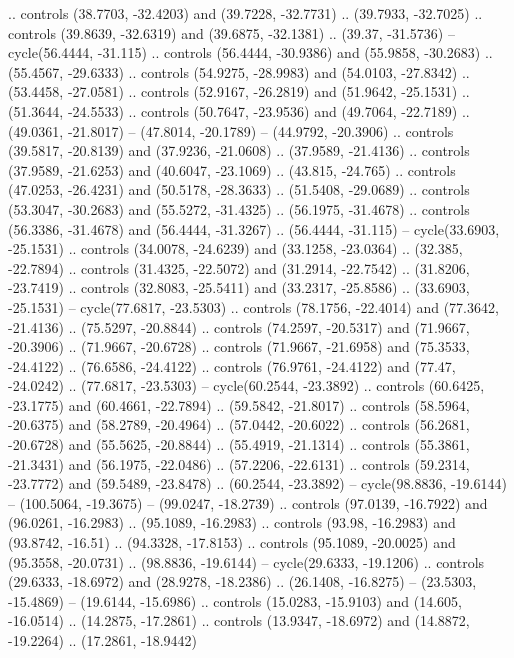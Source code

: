 {  .. controls (38.7703, -32.4203) and (39.7228, -32.7731) .. (39.7933, -32.7025)
  .. controls (39.8639, -32.6319) and (39.6875, -32.1381) .. (39.37, -31.5736)
  -- cycle(56.4444, -31.115)
  .. controls (56.4444, -30.9386) and (55.9858, -30.2683) .. (55.4567, -29.6333)
  .. controls (54.9275, -28.9983) and (54.0103, -27.8342) .. (53.4458, -27.0581)
  .. controls (52.9167, -26.2819) and (51.9642, -25.1531) .. (51.3644, -24.5533)
  .. controls (50.7647, -23.9536) and (49.7064, -22.7189) .. (49.0361, -21.8017)
  -- (47.8014, -20.1789)
  -- (44.9792, -20.3906)
  .. controls (39.5817, -20.8139) and (37.9236, -21.0608) .. (37.9589, -21.4136)
  .. controls (37.9589, -21.6253) and (40.6047, -23.1069) .. (43.815, -24.765)
  .. controls (47.0253, -26.4231) and (50.5178, -28.3633) .. (51.5408, -29.0689)
  .. controls (53.3047, -30.2683) and (55.5272, -31.4325) .. (56.1975, -31.4678)
  .. controls (56.3386, -31.4678) and (56.4444, -31.3267) .. (56.4444, -31.115)
  -- cycle(33.6903, -25.1531)
  .. controls (34.0078, -24.6239) and (33.1258, -23.0364) .. (32.385, -22.7894)
  .. controls (31.4325, -22.5072) and (31.2914, -22.7542) .. (31.8206, -23.7419)
  .. controls (32.8083, -25.5411) and (33.2317, -25.8586) .. (33.6903, -25.1531)
  -- cycle(77.6817, -23.5303)
  .. controls (78.1756, -22.4014) and (77.3642, -21.4136) .. (75.5297, -20.8844)
  .. controls (74.2597, -20.5317) and (71.9667, -20.3906) .. (71.9667, -20.6728)
  .. controls (71.9667, -21.6958) and (75.3533, -24.4122) .. (76.6586, -24.4122)
  .. controls (76.9761, -24.4122) and (77.47, -24.0242) .. (77.6817, -23.5303)
  -- cycle(60.2544, -23.3892)
  .. controls (60.6425, -23.1775) and (60.4661, -22.7894) .. (59.5842, -21.8017)
  .. controls (58.5964, -20.6375) and (58.2789, -20.4964) .. (57.0442, -20.6022)
  .. controls (56.2681, -20.6728) and (55.5625, -20.8844) .. (55.4919, -21.1314)
  .. controls (55.3861, -21.3431) and (56.1975, -22.0486) .. (57.2206, -22.6131)
  .. controls (59.2314, -23.7772) and (59.5489, -23.8478) .. (60.2544, -23.3892)
  -- cycle(98.8836, -19.6144)
  -- (100.5064, -19.3675)
  -- (99.0247, -18.2739)
  .. controls (97.0139, -16.7922) and (96.0261, -16.2983) .. (95.1089, -16.2983)
  .. controls (93.98, -16.2983) and (93.8742, -16.51) .. (94.3328, -17.8153)
  .. controls (95.1089, -20.0025) and (95.3558, -20.0731) .. (98.8836, -19.6144)
  -- cycle(29.6333, -19.1206)
  .. controls (29.6333, -18.6972) and (28.9278, -18.2386) .. (26.1408, -16.8275)
  -- (23.5303, -15.4869)
  -- (19.6144, -15.6986)
  .. controls (15.0283, -15.9103) and (14.605, -16.0514) .. (14.2875, -17.2861)
  .. controls (13.9347, -18.6972) and (14.8872, -19.2264) .. (17.2861, -18.9442)
}
